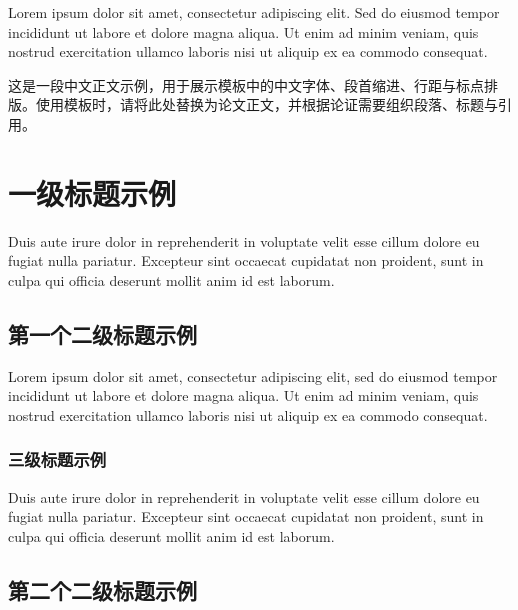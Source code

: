 \documentclass[BAhumanities,customization]{main}
\begin{document}
\hypersetup{pageanchor=false}
\makepages
\hypersetup{pageanchor=true}

\presetupOFabstractCN


\presetupOFtocs
\tableofcontents
{}

\pesudohookOFpremainbody

Lorem ipsum dolor sit amet, consectetur adipiscing elit. Sed do eiusmod tempor incididunt ut labore et dolore magna aliqua. Ut enim ad minim veniam, quis nostrud exercitation ullamco laboris nisi ut aliquip ex ea commodo consequat.

这是一段中文正文示例，用于展示模板中的中文字体、段首缩进、行距与标点排版。使用模板时，请将此处替换为论文正文，并根据论证需要组织段落、标题与引用。

\section{一级标题示例}

Duis aute irure dolor in reprehenderit in voluptate velit esse cillum dolore eu fugiat nulla pariatur. Excepteur sint occaecat cupidatat non proident, sunt in culpa qui officia deserunt mollit anim id est laborum.

\subsection{第一个二级标题示例}

Lorem ipsum dolor sit amet, consectetur adipiscing elit, sed do eiusmod tempor incididunt ut labore et dolore magna aliqua. Ut enim ad minim veniam, quis nostrud exercitation ullamco laboris nisi ut aliquip ex ea commodo consequat.

\subsubsection{三级标题示例}

Duis aute irure dolor in reprehenderit in voluptate velit esse cillum dolore eu fugiat nulla pariatur. Excepteur sint occaecat cupidatat non proident, sunt in culpa qui officia deserunt mollit anim id est laborum.

\subsection{第二个二级标题示例}
\end{document}
